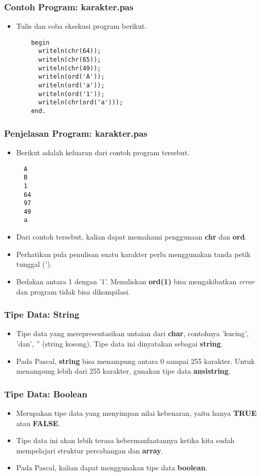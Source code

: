 \begin{frame}[fragile]
\frametitle{Contoh Program: karakter.pas}
\begin{itemize}
  \item Tulis dan coba eksekusi program berikut.
  \begin{lstlisting}
    begin
      writeln(chr(64));
      writeln(chr(65));
      writeln(chr(49));
      writeln(ord('A'));
      writeln(ord('a'));
      writeln(ord('1'));
      writeln(chr(ord('a')));
    end.
  \end{lstlisting}
\end{itemize}
\end{frame}

\begin{frame}[fragile]
\frametitle{Penjelasan Program: karakter.pas}
\begin{itemize}
  \item Berikut adalah keluaran dari contoh program tersebut.
  \begin{lstlisting}
  A
  B
  1
  64
  97
  49
  a
  \end{lstlisting}
  \item Dari contoh tersebut, kalian dapat memahami penggunaan \textbf{chr} dan \textbf{ord}.
  \item Perhatikan pula penulisan suatu karakter perlu menggunakan tanda petik tunggal (').
  \item Bedakan antara 1 dengan '1'. Menuliskan \textbf{ord(1)} bisa mengakibatkan \textit{error} dan program tidak bisa dikompilasi.
\end{itemize}
\end{frame}

\begin{frame}
\frametitle{Tipe Data: String}
\begin{itemize}
  \item Tipe data yang merepresentasikan untaian dari \textbf{char}, contohnya 'kucing', 'dan', '' (string kosong). Tipe data ini dinyatakan sebagai \alert{\textbf{string}}.
  \item Pada Pascal, \textbf{string} bisa menampung antara 0 sampai 255 karakter. Untuk menampung lebih dari 255 karakter, gunakan tipe data \alert{\textbf{ansistring}}.
\end{itemize}
\end{frame}

\begin{frame}
\frametitle{Tipe Data: Boolean}
\begin{itemize}
  \item Merupakan tipe data yang menyimpan nilai kebenaran, yaitu hanya \textbf{TRUE} atau \textbf{FALSE}.
  \item Tipe data ini akan lebih terasa kebermanfaatannya ketika kita sudah mempelajari struktur percabangan dan \textbf{array}.
  \item Pada Pascal, kalian dapat menggunakan tipe data \alert{\textbf{boolean}}.
\end{itemize}
\end{frame}

